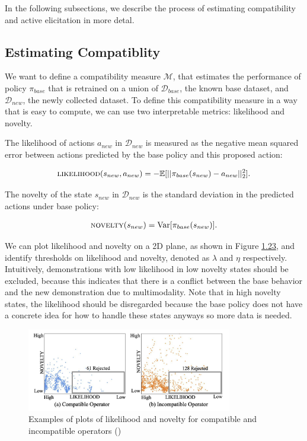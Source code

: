 \documentclass[
  letterpaper,
  DIV=11,
  numbers=noendperiod,
  oneside]{scrreprt}
\theoremstyle{remark}
\begin{document}
In the following subsections, we describe the process of estimating
compatibility and active elicitation in more detal.

\subsection{Estimating Compatiblity}\label{estimating-compatiblity}

We want to define a compatibility measure \(\mathcal{M}\), that
estimates the performance of policy \(\pi_{base}\) that is retrained on
a union of \(\mathcal{D}_{base}\), the known base dataset, and
\(\mathcal{D}_{new}\), the newly collected dataset. To define this
compatibility measure in a way that is easy to compute, we can use two
interpretable metrics: likelihood and novelty.

The likelihood of actions \(a_{new}\) in \(\mathcal{D}_{new}\) is
measured as the negative mean squared error between actions predicted by
the base policy and this proposed action:

\[\begin{aligned}
    \textsc{likelihood}(s_{new}, a_{new}) = -\mathbb{E}[|| \pi_{base}(s_{new}) - a_{new} ||^2_2].
\end{aligned}\]

The novelty of the state \(s_{new}\) in \(\mathcal{D}_{new}\) is the
standard deviation in the predicted actions under base policy:

\[\begin{aligned}
    \textsc{novelty}(s_{new}) = \mathrm{Var}[\pi_{base}(s_{new})].
\end{aligned}\]

We can plot likelihood and novelty on a 2D plane, as shown in Figure
\hyperref[fig:likelihood_novelty]{1.23}, and identify thresholds on
likelihood and novelty, denoted as \(\lambda\) and \(\eta\)
respectively. Intuitively, demonstrations with low likelihood in low
novelty states should be excluded, because this indicates that there is
a conflict between the base behavior and the new demonstration due to
multimodality. Note that in high novelty states, the likelihood should
be disregarded because the base policy does not have a concrete idea for
how to handle these states anyways so more data is needed.

\begin{figure}

{\centering \includegraphics[width=0.8\textwidth,height=\textheight]{src/Figures/likelihood_novelty.png}

}

\caption{Examples of plots of likelihood and novelty for compatible and
incompatible operators ()}

\end{figure}%
\end{document}
